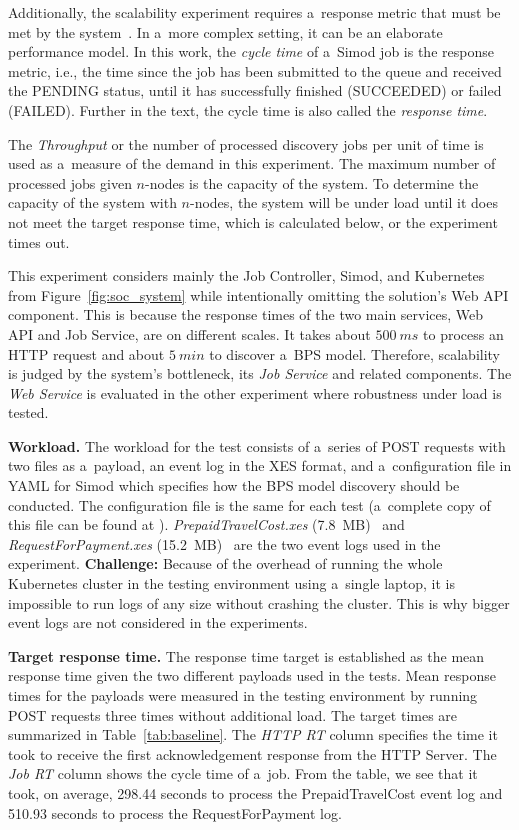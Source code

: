 \documentclass[12pt]{article}
\begin{document}
Additionally, the scalability experiment requires a~response metric that must be met by the system~\cite[p.~13]{weinstock_system_2006}. In a~more complex setting, it can be an elaborate performance model. In this work, the \emph{cycle time} of a~Simod job is the response metric, i.e., the time since the job has been submitted to the queue and received the \textsc{PENDING} status, until it has successfully finished (\textsc{SUCCEEDED}) or failed (\textsc{FAILED}). Further in the text, the cycle time is also called the \emph{response time}.

The \emph{Throughput} or the number of processed discovery jobs per unit of time is used as a~measure of the demand in this experiment. The maximum number of processed jobs given $n$-nodes is the capacity of the system. To determine the capacity of the system with $n$-nodes, the system will be under load until it does not meet the target response time, which is calculated below, or the experiment times out. 

This experiment considers mainly the Job Controller, Simod, and Kubernetes from Figure~\ref{fig:soc_system} while intentionally omitting the solution's Web API component. This is because the response times of the two main services, Web API and Job Service, are on different scales. It takes about $500~ms$ to process an HTTP request and about $5~min$ to discover a~BPS model. Therefore, scalability is judged by the system's bottleneck, its \emph{Job Service} and related components. The \emph{Web Service} is evaluated in the other experiment where robustness under load is tested.

\textbf{Workload.} The workload for the test consists of a~series of POST requests with two files as a~payload, an event log in the XES format, and a~configuration file in YAML for Simod which specifies how the BPS model discovery should be conducted. The configuration file is the same for each test (a~complete copy of this file can be found at ). \emph{PrepaidTravelCost.xes} (7.8~MB)~\cite{van_dongen_bpi_2020_travel} and \emph{RequestForPayment.xes} (15.2~MB)~\cite{van_dongen_bpi_2020_payment} are the two event logs used in the experiment. \textbf{Challenge:} Because of the overhead of running the whole Kubernetes cluster in the testing environment using a~single laptop, it is impossible to run logs of any size without crashing the cluster. This is why bigger event logs are not considered in the experiments.

\textbf{Target response time.} The response time target is established as the mean response time given the two different payloads used in the tests. Mean response times for the payloads were measured in the testing environment by running POST requests three times without additional load. The target times are summarized in Table~\ref{tab:baseline}. The \emph{HTTP RT} column specifies the time it took to receive the first acknowledgement response from the HTTP Server. The \emph{Job RT} column shows the cycle time of a~job. From the table, we see that it took, on average, 298.44 seconds to process the PrepaidTravelCost event log and 510.93 seconds to process the RequestForPayment log.
\end{document}
